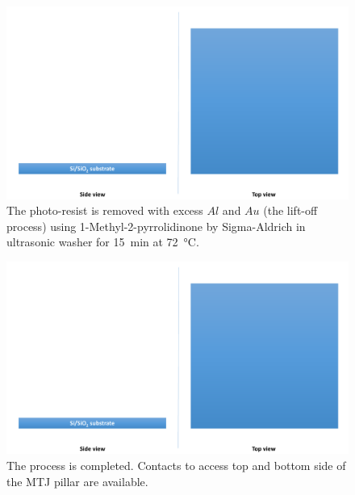 \begin{multicols}{2}[]
    
    \begin{figure}[H]
        \centering
        \includegraphics[width=0.375\paperwidth, page=19]{img/04/Manufacturing_under.pdf}
        \caption{The photo-resist is removed with excess $Al$ and $Au$ (the lift-off process) using 1-Methyl-2-pyrrolidinone by Sigma-Aldrich in ultrasonic washer for \SI{15}{\minute} at \SI{72}{\celsius}.}
        \label{FabricationTopLiftOff}
    \end{figure}
    
    \begin{figure}[H]
        \centering
        \includegraphics[width=0.375\paperwidth, page=20]{img/04/Manufacturing_under.pdf}
        \caption{The process is completed. Contacts to access top and bottom side of the MTJ pillar are available.}
        \label{FabricationComplete}
    \end{figure}
    
\end{multicols}